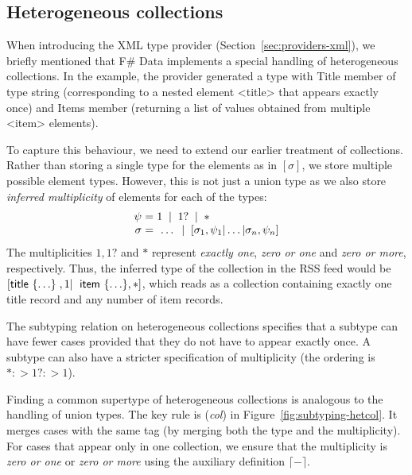 \documentclass[10pt,preprint,blind,clearpagebib]{sigplanconf}
\newcommand{\ident}[1]{\textnormal{\sffamily #1}}
\newcommand{\lsep}[0]{\;\; | \;\;}
\newcommand{\narrow}[1]{\hspace{-0.7em} #1 \hspace{-0.7em}}
\newcommand{\addopt}[1]{\lceil#1\rceil}
\begin{document}
\subsection{Heterogeneous collections}
\label{sec:impl-collections}

When introducing the XML type provider (Section~\ref{sec:providers-xml}), we briefly mentioned 
that F\# Data implements a special handling of heterogeneous collections. In the example, the provider
generated a type with \ident{Title} member of type \ident{string} (corresponding to a nested element
{\ttfamily\small <title>} that appears exactly once) and \ident{Items} member (returning a list of
values obtained from multiple {\ttfamily\small <item>} elements).

To capture this behaviour, we need to extend our earlier treatment of collections. Rather than storing
a single type for the elements as in $[\sigma]$, we store multiple possible element types. However,
this is not just a union type as we also store \emph{inferred multiplicity} of elements for 
each of the types:
%
\begin{equation*}
\begin{array}{rcl}
 \psi &\narrow{=}& 1 \lsep 1? \lsep \ast \\
 \sigma &\narrow{=}& ~\ldots \lsep [\sigma_1, \psi_1 | \ldots | \sigma_n, \psi_n ]
\end{array}
\end{equation*}
%
The multiplicities $1, 1?$ and $\ast$ represent \emph{exactly one}, \emph{zero or one} and \emph{zero or more},
respectively. Thus, the inferred type of the collection in the RSS feed would be
$[\ident{title}~\{ \ldots \}\;,1|\;\ident{item}~\{ \ldots \},\ast]$, which reads as a collection
containing exactly one \ident{title} record and any number of \ident{item} records.

The subtyping relation on heterogeneous collections specifies that a subtype can have fewer cases 
provided that they do not have to appear exactly once. A subtype can also have a stricter specification
of multiplicity (the ordering is $\ast :> 1? :> 1$). 

Finding a common supertype of heterogeneous collections is analogous to the handling of union types.
The key rule is (\emph{col}) in Figure~\ref{fig:subtyping-hetcol}. It merges cases with the same tag
(by merging both the type and the multiplicity). For cases that appear only in one collection, we ensure
that the multiplicity is \emph{zero or one} or \emph{zero or more} using the auxiliary definition
$\addopt{-}$.
\end{document}

